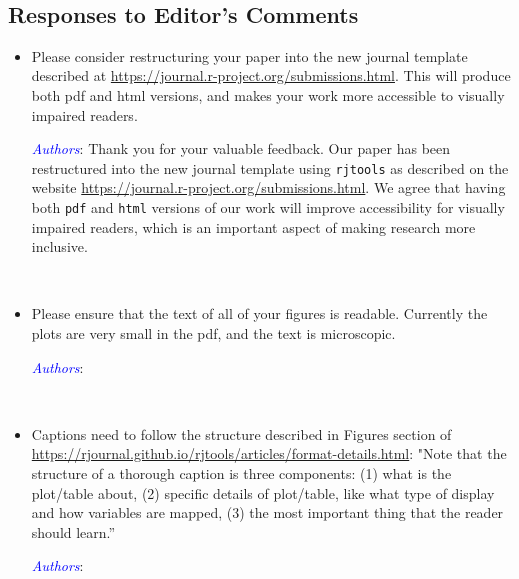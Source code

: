 \documentclass[11pt]{article}
\newcommand{\authors}[1]{

 \parbox{15cm}{\textcolor{blue}{\it Authors}: \color{red}#1}
 \\ \vspace{0.3cm}
}
\begin{document}
 \\

\subsection*{Responses to Editor's Comments}
\vspace{0.5cm}

\begin{itemize}
\item
Please consider restructuring your paper into the new journal template described at \url{https://journal.r-project.org/submissions.html}. This will produce both pdf and html versions, and makes your work more accessible to visually impaired readers.
\authors{
Thank you for your valuable feedback. Our paper has been restructured into the new journal template using {\tt rjtools} as described on the website \url{https://journal.r-project.org/submissions.html}. We agree that having both {\tt pdf} and {\tt html} versions of our work will improve accessibility for visually impaired readers, which is an important aspect of making research more inclusive.
}


\item
Please ensure that the text of all of your figures is readable. Currently the plots are very small in the pdf, and the text is microscopic.
\authors{

}


\item
Captions need to follow the structure described in Figures section of \url{https://rjournal.github.io/rjtools/articles/format-details.html}: "Note that the structure of a thorough caption is three components: (1) what is the plot/table about, (2) specific details of plot/table, like what type of display and how variables are mapped, (3) the most important thing that the reader should learn.”
\authors{

}
\end{itemize}
 





\clearpage{} 
\end{document}
